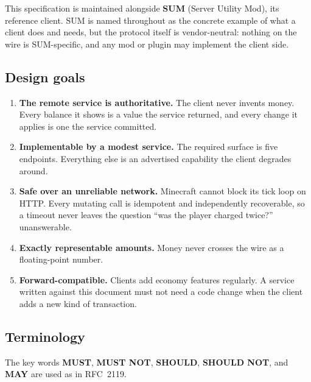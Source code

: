 \documentclass[11pt,a4paper]{article}
\newcommand{\req}{\textbf{MUST}}
\newcommand{\rec}{\textbf{SHOULD}}
\newcommand{\opt}{\textbf{MAY}}
\begin{document}
This specification is maintained alongside \textbf{SUM} (Server Utility Mod), its reference client.
SUM is named throughout as the concrete example of what a client does and needs, but the protocol
itself is vendor-neutral: nothing on the wire is SUM-specific, and any mod or plugin may implement
the client side.

\subsection{Design goals}

\begin{enumerate}
\item \textbf{The remote service is authoritative.} The client never invents money. Every balance it
      shows is a value the service returned, and every change it applies is one the service
      committed.
\item \textbf{Implementable by a modest service.} The required surface is five endpoints.
      Everything else is an advertised capability the client degrades around.
\item \textbf{Safe over an unreliable network.} Minecraft cannot block its tick loop on HTTP. Every
      mutating call is idempotent and independently recoverable, so a timeout never leaves the
      question ``was the player charged twice?'' unanswerable.
\item \textbf{Exactly representable amounts.} Money never crosses the wire as a floating-point
      number.
\item \textbf{Forward-compatible.} Clients add economy features regularly. A service written
      against this document must not need a code change when the client adds a new kind of
      transaction.
\end{enumerate}

\subsection{Terminology}

The key words \req, \textbf{MUST NOT}, \rec, \textbf{SHOULD NOT}, and \opt{} are used as in
RFC~2119.
\end{document}

